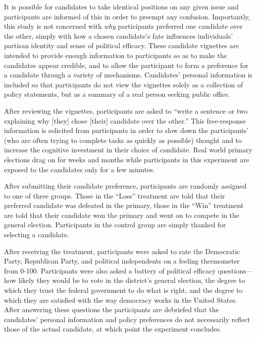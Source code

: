 \documentclass[
]{article}
\begin{document}
It is possible for candidates to take identical positions on any given issue and participants are informed of this in order to preempt any confusion. Importantly, this study is not concerned with \emph{why} participants preferred one candidate over the other, simply with how a chosen candidate's fate influences individuals' partisan identity and sense of political efficacy. These candidate vignettes are intended to provide enough information to participants so as to make the candidates appear credible, and to allow the participant to form a preference for a candidate through a variety of mechanisms. Candidates' personal information is included so that participants do not view the vignettes solely as a collection of policy statements, but as a summary of a real person seeking public office.

After reviewing the vignettes, participants are asked to ``write a sentence or two explaining why {[}they{]} chose {[}their{]} candidate over the other.'' This free-response information is solicited from participants in order to slow down the participants' (who are often trying to complete tasks as quickly as possible) thought and to increase the cognitive investment in their choice of candidate. Real world primary elections drag on for weeks and months while participants in this experiment are exposed to the candidates only for a few minutes.

After submitting their candidate preference, participants are randomly assigned to one of three groups. Those in the ``Loss'' treatment are told that their preferred candidate was defeated in the primary, those in the ``Win'' treatment are told that their candidate won the primary and went on to compete in the general election. Participants in the control group are simply thanked for selecting a candidate.

After receiving the treatment, participants were asked to rate the Democratic Party, Republican Party, and political independents on a feeling thermometer from 0-100. Participants were also asked a battery of political efficacy questions---how likely they would be to vote in the district's general election, the degree to which they trust the federal government to do what is right, and the degree to which they are satisfied with the way democracy works in the United States. After answering these questions the participants are debriefed that the candidates' personal information and policy preferences do not necessarily reflect those of the actual candidate, at which point the experiment concludes.
\end{document}
